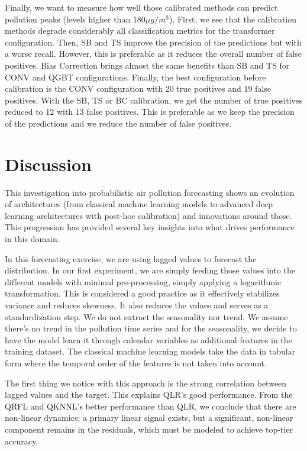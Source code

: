 \documentclass[12pt,a4paper]{book}
\begin{document}
Finally, we want to measure how well those calibrated methods can predict pollution peaks (levels higher than 180$\mu g/m^3$). First, we see that the calibration methods degrade considerably all classification metrics for the transformer configuration. Then, SB and TS improve the precision of the predictions but with a worse recall. However, this is preferable as it reduces the overall number of false positives. Bias Correction brings almost the same benefits than SB and TS for CONV and QGBT configurations. Finally, the best configuration before calibration is the CONV configuration with 20 true positives and 19 false positives. With the SB, TS or BC calibration, we get the number of true positives reduced to 12 with 13 false positives. This is preferable as we keep the precision of the predictions and we reduce the number of false positives. 

\chapter{Discussion}
This investigation into probabilistic air pollution forecasting shows an evolution of architectures (from classical machine learning models to advanced deep learning architectures with post-hoc calibration) and innovations around those. This progression has provided several key insights into what drives performance in this domain.

In this forecasting exercise, we are using lagged values to forecast the \no{} distribution. In our first experiment, we are simply feeding those values into the different models with minimal pre-processing, simply applying a logarithmic transformation. This is considered a good practice as it effectively stabilizes variance and reduces skewness. It also reduces the values and serves as a standardization step. We do not extract the seasonality nor trend. We assume there's no trend in the pollution time series and for the seasonality, we decide to have the model learn it through calendar variables as additional features in the training dataset. The classical machine learning models take the data in tabular form where the temporal order of the features is not taken into account. 

The first thing we notice with this approach is the strong correlation between lagged values and the target. This explains QLR's good performance. From the QRFL and QKNNL's better performance than QLR, we conclude that there are non-linear dynamics: a primary linear signal exists, but a significant, non-linear component remains in the residuals, which must be modeled to achieve top-tier accuracy.
\end{document}
